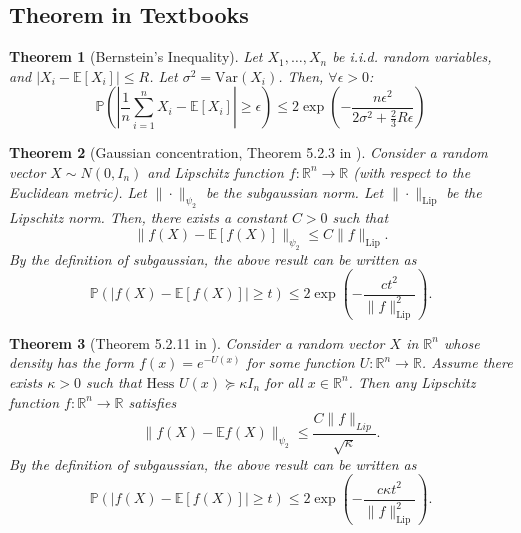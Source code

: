 \documentclass[12pt]{article}
\newtheorem{theorem}{Theorem}%
\newcommand{\E}{\mathbb{E}}
\newcommand{\R}{\mathbb{R}}
\newcommand{\pr}{\mathbb{P}}
\begin{document}

\subsection{Theorem in Textbooks}

\begin{theorem}[Bernstein's Inequality]\label{thm:bernstein}
Let $X_1,\ldots,X_n$ be i.i.d. random variables, and $
|X_i - \E[X_i]|\leq R$. Let $\sigma^2 = \text{Var}(X_i)$. Then, $\forall  \epsilon>0$:
$$\pr\left(\left|\frac{1}{n}\sum_{i=1}^n X_i - \E[X_i]\right|\geq \epsilon\right)\leq 2\exp\left(-\frac{n\epsilon^2}{2\sigma^2 + \frac{2}{3}R\epsilon}\right)$$

\end{theorem}
\begin{theorem}[Gaussian concentration, Theorem 5.2.3 in \cite{vershynin2018high}]\label{thm:gaussian_concentration} Consider a random vector $X\sim N(0,I_n)$ and Lipschitz function $f:\R^n\rightarrow \R$ (with respect to the Euclidean metric). Let $\|\cdot\|_{\psi_2}$ be the subgaussian norm. Let $\|\cdot\|_{\mathrm{Lip}}$ be the Lipschitz norm. Then, there exists a constant $C>0$ such that
$$\|f(X)-\E[f(X)]\|_{\psi_2}\leq C\|f\|_{\mathrm{Lip}}.$$
By the definition of subgaussian, the above result can be written as 
$$\pr\left(\left|f(X)-\E[f(X)]\right|\geq t\right)\leq 2\exp\left(-\frac{ct^2}{\|f\|^2_{\mathrm{Lip}}}\right).$$

\end{theorem}

\begin{theorem}[Theorem 5.2.11 in \citet{vershynin2018high}]\label{thm:exponential_density_concentration}
    Consider a random vector $X$ in $\mathbb{R}^n$ whose density has the form $f(x) = e^{-U(x)}$ for some function $U : \mathbb{R}^n \to \mathbb{R}$. Assume there exists $\kappa > 0$ such that $\text{Hess } U(x) \succeq \kappa I_n$ for all $x \in \mathbb{R}^n$. Then any Lipschitz function $f : \mathbb{R}^n \to \mathbb{R}$ satisfies
\[
\|f(X) - \mathbb{E} f(X)\|_{\psi_2} \leq \frac{C\|f\|_{Lip}}{\sqrt{\kappa}}.
\]
By the definition of subgaussian, the above result can be written as 
$$\pr\left(\left|f(X)-\E[f(X)]\right|\geq t\right)\leq 2\exp\left(-\frac{c\kappa t^2}{\|f\|^2_{\mathrm{Lip}}}\right).$$

\end{theorem}
\end{document}
